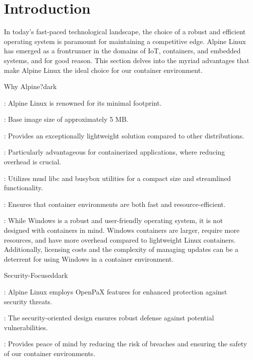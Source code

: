 \section{Introduction}
In today's fast-paced technological landscape, the choice of a robust and efficient operating system is paramount for maintaining a competitive edge.
Alpine Linux has emerged as a frontrunner in the domains of IoT, containers, and embedded systems, and for good reason.
This section delves into the myriad advantages that make Alpine Linux the ideal choice for our container environment.
\bigskip
{}
\label{Why Alpine?}
\begin{baseBoxThree}{Why Alpine?}{dark}
    \bigskip
    \begin{posnexItemize}
        \item[\sA] : Alpine Linux is renowned for its minimal footprint.
        \item[\sA] : Base image size of approximately 5 MB.
        \item[\sA] : Provides an exceptionally lightweight solution compared to other distributions.
        \item[\sA] : Particularly advantageous for containerized applications, where reducing overhead is crucial.
        \item[\sA] : Utilizes musl libc and busybox utilities for a compact size and streamlined functionality.
        \item[\sA] : Ensures that container environments are both fast and resource-efficient.
        \item[\sA] : While Windows is a robust and user-friendly operating system, it is not designed with containers in mind. Windows containers are larger, require more resources, and have more overhead compared to lightweight Linux containers. Additionally, licensing costs and the complexity of managing updates can be a deterrent for using Windows in a container environment.
    \end{posnexItemize}
    \smallskip
\end{baseBoxThree}

\label{Security-Focused}
\begin{baseBoxThree}{Security-Focused}{dark}
    \begin{posnexItemize} 
        \item[\sA] : Alpine Linux employs OpenPaX features for enhanced protection against security threats.
        \item[\sA] : The security-oriented design ensures robust defense against potential vulnerabilities.
        \item[\sA] : Provides peace of mind by reducing the risk of breaches and ensuring the safety of our container environments.
    \end{posnexItemize}
\end{baseBoxThree}

